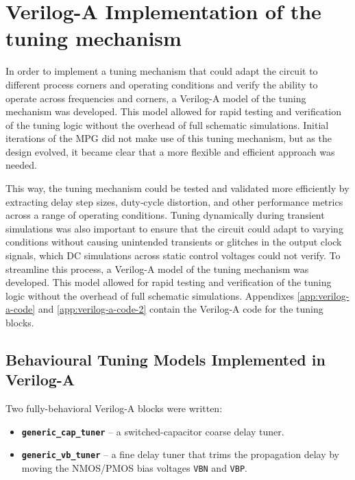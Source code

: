 \section{Verilog-A Implementation of the tuning mechanism}\label{sec:RTL_tuning}
In order to implement a tuning mechanism that could adapt the circuit to different process corners and operating conditions and verify the ability to operate across frequencies and corners, a Verilog-A model of the tuning mechanism was developed. This model allowed for rapid testing and verification of the tuning logic without the overhead of full schematic simulations. Initial iterations of the MPG did not make use of this tuning mechanism, but as the design evolved, it became clear that a more flexible and efficient approach was needed.

This way, the tuning mechanism could be tested and validated more efficiently by extracting delay step sizes, duty‑cycle distortion, and other performance metrics across a range of operating conditions. Tuning dynamically during transient simulations was also important to ensure that the circuit could adapt to varying conditions without causing unintended transients or glitches in the output clock signals, which DC simulations across static control voltages could not verify.
To streamline this process, a Verilog-A model of the tuning mechanism was developed. This model allowed for rapid testing and verification of the tuning logic without the overhead of full schematic simulations. Appendixes \ref{app:verilog-a-code} and \ref{app:verilog-a-code-2} contain the Verilog-A code for the tuning blocks.

\subsection{Behavioural Tuning Models Implemented in Verilog-A}
\label{sec:Verilog-A_tuners}

Two fully-behavioral Verilog-A blocks were written:

\begin{itemize}
  \item \textbf{\texttt{generic\_cap\_tuner}} – a switched-capacitor coarse delay tuner.
  \item \textbf{\texttt{generic\_vb\_tuner}} – a fine delay tuner that trims the propagation delay by moving the NMOS/PMOS bias voltages \texttt{VBN} and \texttt{VBP}.
\end{itemize}

